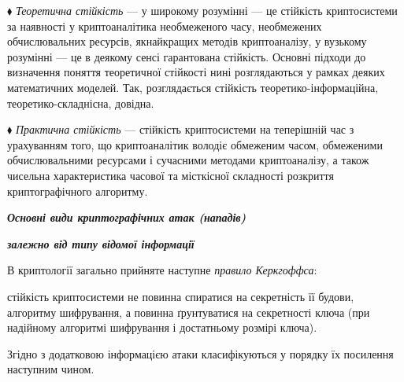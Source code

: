 $\blacklozenge$ \textit{Теоретична стійкість }---  у широкому розумінні --- це
стійкість криптосистеми за наявності у криптоаналітика необмеженого часу,
необмежених обчислювальних ресурсів, якнайкращих методів криптоаналізу, у
вузькому розумінні --- це в деякому сенсі гарантована стійкість. Основні підходи
до визначення поняття теоретичної стійкості нині розглядаються у рамках деяких
математичних моделей. Так, розглядається стійкість теоретико-інформаційна,
теоретико-складнісна, довідна. 

$\blacklozenge$ \textit{Практична стійкість }--- стійкість криптосистеми на
теперішній час з урахуванням того, що криптоаналітик володіє обмеженим часом,
обмеженими обчислювальними ресурсами і сучасними методами криптоаналізу,  а
також чисельна характеристика часової та місткісної складності розкриття
криптографічного алгоритму. 


\bigskip


\bigskip

{\centering\bfseries\itshape
Основні види криптографічних атак (нападів)
\par}

{\centering\bfseries\itshape
 залежно від типу відомої інформації
\par}


\bigskip


\bigskip

В криптології загально прийняте  наступне \textit{правило Керкгоффса}: 

 стійкість криптосистеми не повинна спиратися на секретність її будови,
алгоритму шифрування,  а повинна ґрунтуватися на секретності ключа (при
надійному алгоритмі шифрування і достатньому розмірі ключа). 

Згідно з додатковою інформацією атаки класифікуються у порядку їх посилення
наступним чином.

